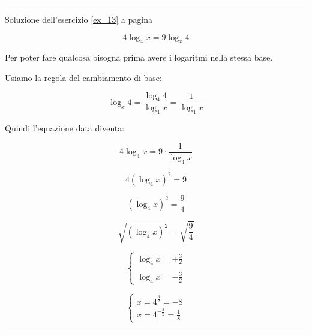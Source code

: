 \vspace{1cm}
\hrule
\vspace{1cm}

Soluzione dell'esercizio \ref{ex_13} a pagina \pageref{ex_13}\label{sol_13}

\begin{equation*}
4\log_4 x=9\log_x 4
\end{equation*}

Per poter fare qualcosa bisogna prima avere i logaritmi nella stessa base.

Usiamo la regola del cambiamento di base:

\begin{equation*}
\log_x 4=\frac{
\log_4 4
}{
\log_4 x
}=\frac{
1
}{
\log_4 x
}
\end{equation*}

Quindi l'equazione data diventa:

\begin{equation*}
4\log_4 x=9 \cdot\frac{
1
}{
\log_4 x
}
\end{equation*}


\begin{equation*}
4(\log_4 x)^2 = 9
\end{equation*}

\begin{equation*}
(\log_4 x)^2 = \frac{9}{4}
\end{equation*}

\begin{equation*}
\sqrt{(\log_4 x)^2} = \sqrt{\frac{9}{4}}
\end{equation*}


\begin{equation*}
\left\{
\begin{array}{ll}
\log_4 x=+\frac{3}{2}\\
\\
\log_4 x=-\frac{3}{2}
\end{array}
\right.
\end{equation*}


\begin{equation*}
\left\{
\begin{array}{ll}
x=4^{\frac{3}{2}}=-8\\
x=4^{-\frac{3}{2}}=\frac{1}{8}
\end{array}
\right.
\end{equation*}


\vspace{1cm}
\hrule
\vspace{1cm}


